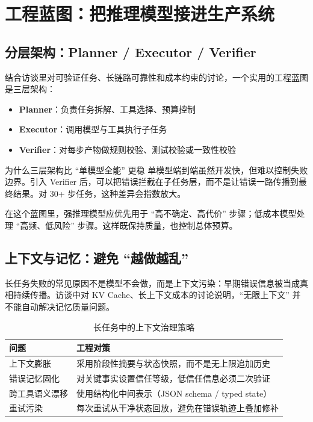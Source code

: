 \section{工程蓝图：把推理模型接进生产系统}

\subsection{分层架构：Planner / Executor / Verifier}

结合访谈里对可验证任务、长链路可靠性和成本约束的讨论，一个实用的工程蓝图是三层架构：
\begin{itemize}
    \item \textbf{Planner}：负责任务拆解、工具选择、预算控制
    \item \textbf{Executor}：调用模型与工具执行子任务
    \item \textbf{Verifier}：对每步产物做规则校验、测试校验或一致性校验
\end{itemize}

\begin{knowledgebox}{为什么三层架构比 ``单模型全能'' 更稳}
单模型端到端虽然开发快，但难以控制失败边界。引入 Verifier 后，可以把错误拦截在子任务层，而不是让错误一路传播到最终结果。对 30+ 步任务，这种差异会指数放大。
\end{knowledgebox}

在这个蓝图里，强推理模型应优先用于 ``高不确定、高代价'' 步骤；低成本模型处理 ``高频、低风险'' 步骤。这样既保持质量，也控制总体预算。

\subsection{上下文与记忆：避免 ``越做越乱''}

长任务失败的常见原因不是模型不会做，而是上下文污染：早期错误信息被当成真相持续传播。访谈中对 KV Cache、长上下文成本的讨论说明，``无限上下文'' 并不能自动解决记忆质量问题。

\begin{table}[H]
\centering
\begin{tabular}{lp{8.7cm}}
\toprule
\textbf{问题} & \textbf{工程对策} \\
\midrule
上下文膨胀 & 采用阶段性摘要与状态快照，而不是无上限追加历史 \\
错误记忆固化 & 对关键事实设置信任等级，低信任信息必须二次验证 \\
跨工具语义漂移 & 使用结构化中间表示（JSON schema / typed state） \\
重试污染 & 每次重试从干净状态回放，避免在错误轨迹上叠加修补 \\
\bottomrule
\end{tabular}
\caption{长任务中的上下文治理策略}
\end{table}


